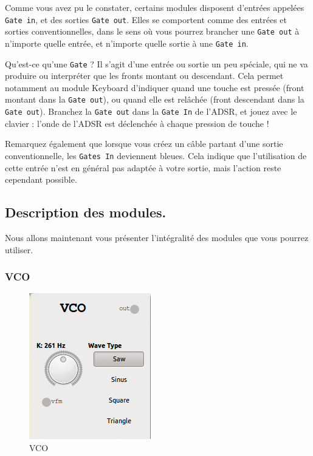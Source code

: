 \documentclass[a4paper,oneside,frenchb,12pt]{article}
\begin{document}
Comme vous avez pu le constater, certains modules disposent d'entrées
appelées \verb!Gate in!, et des sorties \verb!Gate out!. Elles se
comportent comme des entrées et sorties conventionnelles, dans le sens
où vous pourrez brancher une \verb!Gate out! à n'importe quelle entrée,
et n'importe quelle sortie à une \verb!Gate in!.

Qu'est-ce qu'une \verb!Gate! ? Il s'agit d'une entrée ou sortie un peu
spéciale, qui ne va produire ou interpréter que les fronts montant ou
descendant. Cela permet notamment au module Keyboard d'indiquer quand
une touche est pressée (front montant dans la \verb!Gate out!), ou quand
elle est relâchée (front descendant dans la \verb!Gate out!). Branchez
la \verb!Gate out! dans la \verb!Gate In! de l'ADSR, et jouez avec le
clavier : l'onde de l'ADSR est déclenchée à chaque pression de touche !

Remarquez également que lorsque vous créez un câble partant d'une sortie
conventionnelle, les \verb!Gates In! deviennent bleues. Cela indique que
l'utilisation de cette entrée n'est en général pas adaptée à votre
sortie, mais l'action reste cependant possible.

\subsection{Description des modules.}

Nous allons maintenant vous présenter l'intégralité des modules que vous
pourrez utiliser.

\subsubsection{VCO}

\begin{figure}[h!]
\centering
\includegraphics[scale=0.5]{../img/png/vco.png}
\caption{VCO}
\end{figure}
\end{document}
